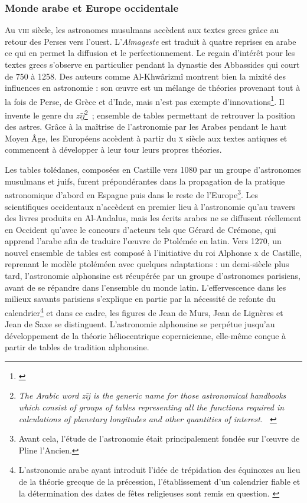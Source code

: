 \documentclass[a4paper,12pt,twoside]{book}
\newcommand{\eng}{\emph}
\newcommand{\VIII}{\textsc{viii}\ieme{}\xspace}
\newcommand{\X}{\textsc{x}\ieme{}\xspace}
\newcommand{\MA}{Moyen Âge\xspace}
\newcommand{\g}[1]{\og#1~\fg}
\begin{document}
			\subsubsection{Monde arabe et Europe occidentale}
Au \VIII siècle, les astronomes musulmans accèdent aux textes grecs grâce au retour des Perses vers l’ouest. L'\emph{Almageste} est traduit à quatre reprises en arabe ce qui en permet la diffusion et le perfectionnement. Le regain d'intérêt pour les textes grecs s'observe en particulier pendant la dynastie des Abbassides qui court de 750 à 1258. Des auteurs comme Al-Khwârizmî montrent bien la mixité des influences en astronomie : son œuvre est un mélange de théories provenant tout à la fois de Perse, de Grèce et d'Inde, mais n'est pas exempte d'innovations\footnote{\cite{evansHistoryAstronomy}}. Il invente le genre du \eng{zīj}\footnote{\g{\eng{The Arabic word \emph{zīj} is the generic name for those astronomical handbooks which consist of groups of tables representing all the functions required in calculations of planetary longitudes and other quantities of interest.}} \cite[p.~451]{mercierStudiesTransmissionMedieval2004}}~; ensemble de tables permettant de retrouver la position des astres. Grâce à la maîtrise de l'astronomie par les Arabes pendant le haut \MA, les Européens accèdent à partir du \X siècle aux textes antiques et commencent à développer à leur tour leurs propres théories.

Les tables tolédanes, composées en Castille vers 1080 par un groupe d'astronomes musulmans et juifs, furent prépondérantes dans la propagation de la pratique astronomique d'abord en Espagne puis dans le reste de l'Europe\footnote{Avant cela, l'étude de l'astronomie était principalement fondée sur l'œuvre de Pline l'Ancien.}. Les scientifiques occidentaux n'accèdent en premier lieu à l'astronomie qu'au travers des livres produits en Al-Andalus, mais les écrits arabes ne se diffusent réellement en Occident qu'avec le concours d'acteurs tels que Gérard de Crémone, qui apprend l'arabe afin de traduire l'œuvre de Ptolémée en latin. Vers 1270, un nouvel ensemble de tables est composé à l'initiative du roi Alphonse \textsc{x} de Castille, reprenant le modèle ptoléméen avec quelques adaptations : un demi-siècle plus tard, l'astronomie alphonsine est récupérée par un groupe d'astronomes parisiens, avant de se répandre dans l'ensemble du monde latin. L'effervescence dans les milieux savants parisiens s'explique en partie par la nécessité de refonte du calendrier\footnote{L'astronomie arabe ayant introduit l'idée de trépidation des équinoxes au lieu de la théorie grecque de la précession, l'établissement d'un calendrier fiable et la détermination des dates de fêtes religieuses sont remis en question. \cite{poulleAstronomesParisiensAu2005}} et dans ce cadre, les figures de Jean de Murs, Jean de Lignères et Jean de Saxe se distinguent. L'astronomie alphonsine se perpétue jusqu'au développement de la théorie héliocentrique copernicienne, elle-même conçue à partir de tables de tradition alphonsine.
\end{document}
